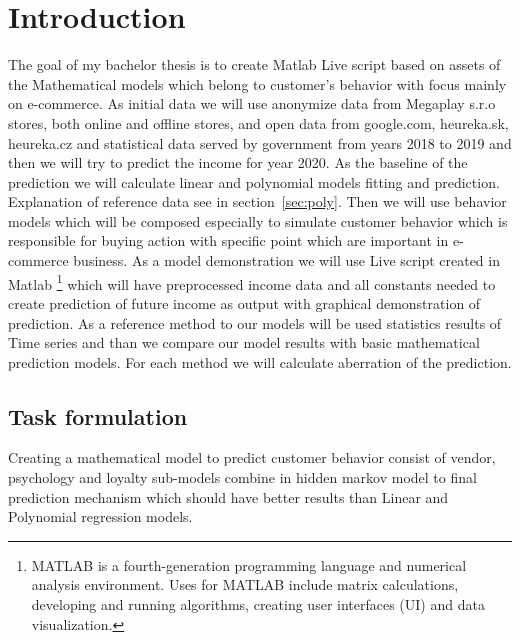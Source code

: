 
{}

\chapter*{Introduction}
The goal of my bachelor thesis is to create  Matlab Live script based on assets of the Mathematical models which belong
to customer’s behavior with focus mainly on e-commerce.
As initial data we will use anonymize data from Megaplay s.r.o stores, both online and offline stores, and open data from google.com,
heureka.sk, heureka.cz and statistical data served by government from years 2018 to 2019 and then we will try to predict the income for year 2020.
As the baseline of the prediction we will calculate linear and polynomial models fitting and prediction.
Explanation of reference data see in section~\ref{sec:poly}.
Then we will use behavior models which will be composed especially to simulate customer behavior which is responsible for
buying action with specific point which are important in e-commerce business.
As a model demonstration we will use  Live script created in Matlab \footnote{MATLAB is a fourth-generation programming
language and numerical analysis environment.
Uses for MATLAB include matrix calculations, developing and running algorithms, creating user interfaces (UI) and data visualization.}
which will have preprocessed income data and all constants needed to create prediction of future income as output with graphical demonstration of prediction.
As a reference method to our models will be used statistics results of Time series and than we compare our model results with
basic mathematical prediction models.
For each method we will calculate aberration of the prediction.

\section*{Task formulation}

Creating a mathematical model to predict customer behavior consist of vendor, psychology and loyalty sub-models combine
in hidden markov model to final prediction mechanism which should have better results than Linear and Polynomial regression models.

